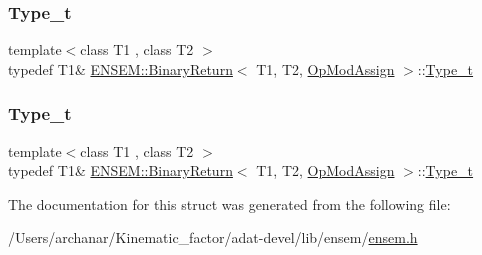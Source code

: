 \mbox{\label{structENSEM_1_1BinaryReturn_3_01T1_00_01T2_00_01OpModAssign_01_4_ac06ca0711867d98edff9da57e7a2fcb3}} 
\subsubsection{\texorpdfstring{Type\_t}{Type\_t}\hspace{0.1cm}{\footnotesize\ttfamily [2/3]}}
{\footnotesize\ttfamily template$<$class T1 , class T2 $>$ \\
typedef T1\& \mbox{\hyperlink{structENSEM_1_1BinaryReturn}{E\+N\+S\+E\+M\+::\+Binary\+Return}}$<$ T1, T2, \mbox{\hyperlink{structENSEM_1_1OpModAssign}{Op\+Mod\+Assign}} $>$\+::\mbox{\hyperlink{structENSEM_1_1BinaryReturn_3_01T1_00_01T2_00_01OpModAssign_01_4_ac06ca0711867d98edff9da57e7a2fcb3}{Type\+\_\+t}}}

\mbox{\label{structENSEM_1_1BinaryReturn_3_01T1_00_01T2_00_01OpModAssign_01_4_ac06ca0711867d98edff9da57e7a2fcb3}} 
\subsubsection{\texorpdfstring{Type\_t}{Type\_t}\hspace{0.1cm}{\footnotesize\ttfamily [3/3]}}
{\footnotesize\ttfamily template$<$class T1 , class T2 $>$ \\
typedef T1\& \mbox{\hyperlink{structENSEM_1_1BinaryReturn}{E\+N\+S\+E\+M\+::\+Binary\+Return}}$<$ T1, T2, \mbox{\hyperlink{structENSEM_1_1OpModAssign}{Op\+Mod\+Assign}} $>$\+::\mbox{\hyperlink{structENSEM_1_1BinaryReturn_3_01T1_00_01T2_00_01OpModAssign_01_4_ac06ca0711867d98edff9da57e7a2fcb3}{Type\+\_\+t}}}



The documentation for this struct was generated from the following file\+:\begin{DoxyCompactItemize}
\item 
/\+Users/archanar/\+Kinematic\+\_\+factor/adat-\/devel/lib/ensem/\mbox{\hyperlink{adat-devel_2lib_2ensem_2ensem_8h}{ensem.\+h}}\end{DoxyCompactItemize}
